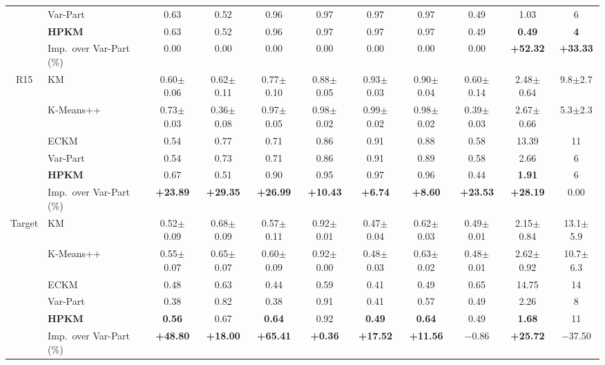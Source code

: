 \begin{table}[p]
\begin{adjustbox}{max width=\textwidth, max totalheight=0.85\textheight}
\begin{tabular}{|c|l|ccccccccc|}
 & Var-Part & 0.63 & 0.52 & 0.96 & 0.97 & 0.97 & 0.97 & 0.49 & 1.03 & 6 \\
 & \textbf{HPKM} & 0.63 & 0.52 & 0.96 & 0.97 & 0.97 & 0.97 & 0.49 & \textbf{0.49} & \textbf{4} \\
& Imp.\ over Var-Part (\%) & 0.00 & 0.00 & 0.00 & 0.00 & 0.00 & 0.00 & 0.00 & \textbf{+52.32} & \textbf{+33.33} \\
\hline
R15 & KM & 0.60$\pm$0.06 & 0.62$\pm$0.11 & 0.77$\pm$0.10 & 0.88$\pm$0.05 & 0.93$\pm$0.03 & 0.90$\pm$0.04 & 0.60$\pm$0.14 & 2.48$\pm$0.64 & 9.8$\pm$2.7 \\
 & K-Means++ & 0.73$\pm$0.03 & 0.36$\pm$0.08 & 0.97$\pm$0.05 & 0.98$\pm$0.02 & 0.99$\pm$0.02 & 0.98$\pm$0.02 & 0.39$\pm$0.03 & 2.67$\pm$0.66 & 5.3$\pm$2.3 \\
 & ECKM & 0.54 & 0.77 & 0.71 & 0.86 & 0.91 & 0.88 & 0.58 & 13.39 & 11 \\
 & Var-Part & 0.54 & 0.73 & 0.71 & 0.86 & 0.91 & 0.89 & 0.58 & 2.66 & 6 \\
 & \textbf{HPKM} & 0.67 & 0.51 & 0.90 & 0.95 & 0.97 & 0.96 & 0.44 & \textbf{1.91} & 6 \\
& Imp.\ over Var-Part (\%) & \textbf{+23.89} & \textbf{+29.35} & \textbf{+26.99} & \textbf{+10.43} & \textbf{+6.74} & \textbf{+8.60} & \textbf{+23.53} & \textbf{+28.19} & 0.00 \\
\hline
Target & KM & 0.52$\pm$0.09 & 0.68$\pm$0.09 & 0.57$\pm$0.11 & 0.92$\pm$0.01 & 0.47$\pm$0.04 & 0.62$\pm$0.03 & 0.49$\pm$0.01 & 2.15$\pm$0.84 & 13.1$\pm$5.9 \\
 & K-Means++ & 0.55$\pm$0.07 & 0.65$\pm$0.07 & 0.60$\pm$0.09 & 0.92$\pm$0.00 & 0.48$\pm$0.03 & 0.63$\pm$0.02 & 0.48$\pm$0.01 & 2.62$\pm$0.92 & 10.7$\pm$6.3 \\
 & ECKM & 0.48 & 0.63 & 0.44 & 0.59 & 0.41 & 0.49 & 0.65 & 14.75 & 14 \\
 & Var-Part & 0.38 & 0.82 & 0.38 & 0.91 & 0.41 & 0.57 & 0.49 & 2.26 & 8 \\
 & \textbf{HPKM} & \textbf{0.56} & 0.67 & \textbf{0.64} & 0.92 & \textbf{0.49} & \textbf{0.64} & 0.49 & \textbf{1.68} & 11 \\
& Imp.\ over Var-Part (\%) & \textbf{+48.80} & \textbf{+18.00} & \textbf{+65.41} & \textbf{+0.36} & \textbf{+17.52} & \textbf{+11.56} & $-$0.86 & \textbf{+25.72} & $-$37.50 \\
\hline
\end{tabular}
\end{adjustbox}
\end{table}

